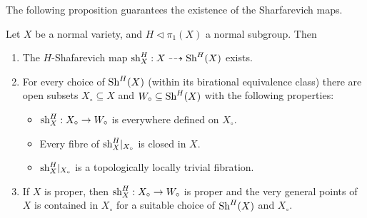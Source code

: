 The following proposition guarantees the existence of the Sharfarevich maps.
\begin{prop}\label{prop-kol-sha}
Let $X$ be a normal variety, and $H\lhd\pi_1(X)$ a normal subgroup. Then
\begin{enumerate}
\item[(1)]The $H$-Shafarevich map $\textup{sh}_X^H:X\dashrightarrow\textup{Sh}^H(X)$ exists.
\item[(2)]For every choice of $\textup{Sh}^H(X)$ (within its birational equivalence class) there are open subsets $X_\circ\subseteq X$ and $W_\circ\subseteq\textup{Sh}^H(X)$ with the following properties:
\begin{itemize}
    \item $\textup{sh}_X^H:X_\circ\to W_\circ$ is everywhere defined on $X_\circ$.
    \item Every fibre of $\textup{sh}_X^H|_{X_\circ}$ is closed in $X$.
    \item $\textup{sh}_X^H|_{X_\circ}$ is a topologically locally trivial fibration.
\end{itemize}
\item[(3)] If $X$ is proper, then $\textup{sh}_X^H:X_\circ\to W_\circ$ is proper and the very general points of $X$ is contained in $X_\circ$ for a suitable choice of $\textup{Sh}^H(X)$ and $X_\circ$.
\end{enumerate}
\end{prop}

